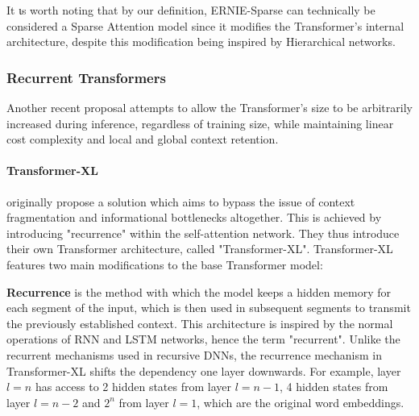 \documentclass[preprint,review,12pt]{elsarticle}
\begin{document}
It ιs worth noting that by our definition, ERNIE-Sparse can technically be considered a Sparse Attention model since it modifies the Transformer's internal architecture, despite this modification being inspired by Hierarchical networks.


\subsubsection{Recurrent Transformers}

Another recent proposal attempts to allow the Transformer's size to be arbitrarily increased during inference, regardless of training size, while maintaining linear cost complexity and local and global context retention.


\paragraph{Transformer-XL} \citet{dai-etal-2019-transformer} originally propose a solution which aims to bypass the issue of context fragmentation and informational bottlenecks altogether. This is achieved by introducing "recurrence" within the self-attention network. They thus introduce their own Transformer architecture, called "Transformer-XL". Transformer-XL features two main modifications to the base Transformer model:
 
\textbf{Recurrence} is the method with which the model keeps a hidden memory for each segment of the input, which is then used in subsequent segments to transmit the previously established context. This architecture is inspired by the normal operations of RNN and LSTM networks, hence the term "recurrent". Unlike the recurrent mechanisms used in recursive DNNs, the recurrence mechanism in Transformer-XL shifts the dependency one layer downwards. For example, layer $l=n$ has access to 2 hidden states from layer $l=n-1$, 4 hidden states from layer $l=n-2$ and $2^n$ from layer $l=1$, which are the original word embeddings.
\end{document}
